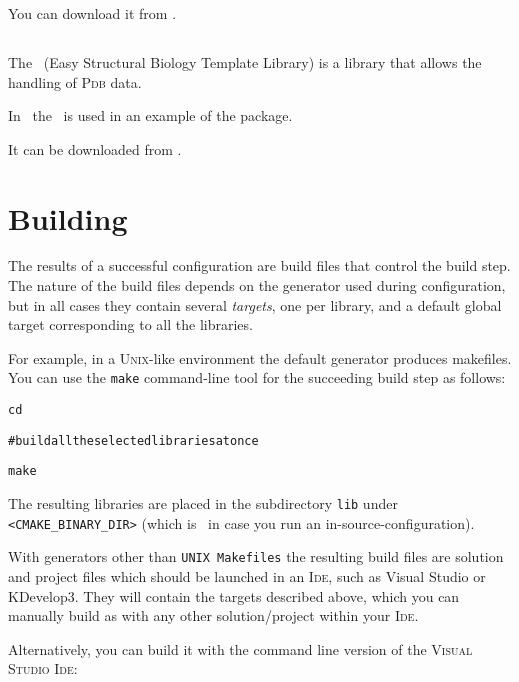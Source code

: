 You can download it from \coinpage.

\subsection{\esbtl \label{thirdparty:ESBTL}}

The \esbtl\ (Easy Structural Biology Template Library) is a library that allows 
the handling of \textsc{Pdb} data.

In \cgal\ the  \esbtl\ is used in an example of the 
 package.

It can be downloaded from \esbtlpage.

\section{Building \cgal \label{sec:building}}

The results of a successful configuration are build files that control the build step.
The nature of the build files depends on the generator used during configuration, but in all cases they 
contain several \emph{targets}, one per library, and a default global target corresponding 
to all the libraries.

For example, in a \textsc{Unix}-like environment the default generator produces
makefiles. You can use the \texttt{make} command-line tool for the
succeeding build step as follows:

{\ccTexHtml{}{}
\begin{alltt}

cd \cgalrel

# build all the selected libraries at once

make 

\end{alltt}
}

The resulting libraries are placed in the subdirectory \texttt{lib} under \texttt{<CMAKE\_BINARY\_DIR>}
(which is \cgalrel\ in case you run an in-source-configuration).

With generators other than \texttt{UNIX Makefiles} the resulting build files
are solution and project files which
should be launched in an \textsc{Ide}, such as Visual Studio or KDevelop3. They will contain the targets described
above, which you can manually build as with any other solution/project within your \textsc{Ide}.

Alternatively, you can build it with the command line version of the
\textsc{Visual Studio Ide}:

